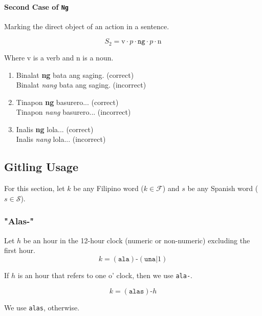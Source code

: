 \paragraph{Second Case of \texttt{Ng}} Marking the direct object of an action in a sentence.

\[
      S_2 = \text{v} \cdot p \cdot \texttt{ng} \cdot p \cdot \text{n}
\]

Where v is a verb and n is a noun.

\begin{example}
\end{example}

\begin{enumerate}
      \item Binalat \textbf{ng} bata ang saging. (correct)
            \\ Binalat \textit{nang} bata ang saging. (incorrect)
      \item Tinapon \textbf{ng} basurero... (correct)
            \\ Tinapon \textit{nang} basurero... (incorrect)
      \item Inalis \textbf{ng} lola... (correct)
            \\ Inalis \textit{nang} lola... (incorrect)
\end{enumerate}

\subsection{Gitling Usage}
For this section, let $k$ be any Filipino word (\(k\in\mathcal{F}\)) and $s$ be any Spanish word (\(s\in\mathcal{S}\)).

\subsubsection{"Alas-"}

Let \(h\) be an hour in the 12-hour clock (numeric or non-numeric) excluding the first hour.
\[
      k = (\texttt{ala})\texttt{-}(\texttt{una} | 1)
\]

If $h$ is an hour that refers to one o' clock, then we use \texttt{ala-}.

\[
      k = (\texttt{alas})\texttt{-}h
\]

We use \texttt{alas}, otherwise.

